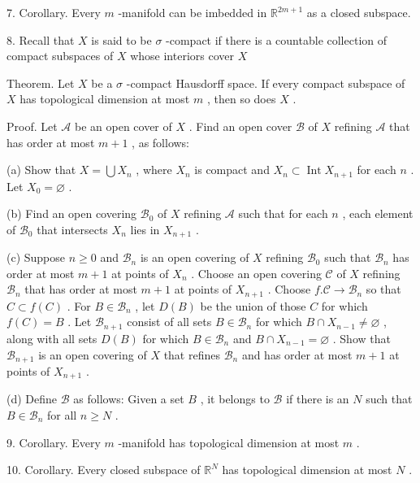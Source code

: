 7. Corollary. Every \(m\) -manifold can be imbedded in \({\mathbb{R}}^{{2m} + 1}\) as a closed subspace.

8. Recall that \(X\) is said to be \(\sigma\) -compact if there is a countable collection of compact subspaces of \(X\) whose interiors cover \(X\)

Theorem. Let \(X\) be a \(\sigma\) -compact Hausdorff space. If every compact subspace of \(X\) has topological dimension at most \(m\) , then so does \(X\) .

Proof. Let \(\mathcal{A}\) be an open cover of \(X\) . Find an open cover \(\mathcal{B}\) of \(X\) refining \(\mathcal{A}\) that has order at most \(m + 1\) , as follows:

(a) Show that \(X = \bigcup {X}_{n}\) , where \({X}_{n}\) is compact and \({X}_{n} \subset  \operatorname{Int}{X}_{n + 1}\) for each \(n\) . Let \({X}_{0} = \varnothing\) .

(b) Find an open covering \({\mathcal{B}}_{0}\) of \(X\) refining \(\mathcal{A}\) such that for each \(n\) , each element of \({\mathcal{B}}_{0}\) that intersects \({X}_{n}\) lies in \({X}_{n + 1}\) .

(c) Suppose \(n \geq  0\) and \({\mathcal{B}}_{n}\) is an open covering of \(X\) refining \({\mathcal{B}}_{0}\) such that \({\mathcal{B}}_{n}\) has order at most \(m + 1\) at points of \({X}_{n}\) . Choose an open covering \(\mathcal{C}\) of \(X\) refining \({\mathcal{B}}_{n}\) that has order at most \(m + 1\) at points of \({X}_{n + 1}\) . Choose \(f.\mathcal{C} \rightarrow  {\mathcal{B}}_{n}\) so that \(C \subset  f\left( C\right)\) . For \(B \in  {\mathcal{B}}_{n}\) , let \(D\left( B\right)\) be the union of those \(C\) for which \(f\left( C\right)  = B\) . Let \({\mathcal{B}}_{n + 1}\) consist of all sets \(B \in  {\mathcal{B}}_{n}\) for which \(B \cap  {X}_{n - 1} \neq  \varnothing\) , along with all sets \(D\left( B\right)\) for which \(B \in  {\mathcal{B}}_{n}\) and \(B \cap  {X}_{n - 1} = \varnothing\) . Show that \({\mathcal{B}}_{n + 1}\) is an open covering of \(X\) that refines \({\mathcal{B}}_{n}\) and has order at most \(m + 1\) at points of \({X}_{n + 1}\) .

(d) Define \(\mathcal{B}\) as follows: Given a set \(B\) , it belongs to \(\mathcal{B}\) if there is an \(N\) such that \(B \in  {\mathcal{B}}_{n}\) for all \(n \geq  N\) .

9. Corollary. Every \(m\) -manifold has topological dimension at most \(m\) .

10. Corollary. Every closed subspace of \({\mathbb{R}}^{N}\) has topological dimension at most \(N\) .

